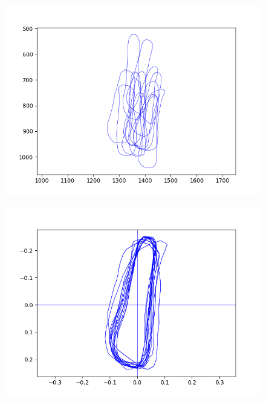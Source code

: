 \documentclass[11pt]{article}
\begin{document}
\begin{figure}[H]
\centering
\begin{minipage}{.5\textwidth}
  \centering
  \includegraphics[width=\linewidth]{unaligned_shapes}
  \label{fig:unaligned}
\end{minipage}%
\begin{minipage}{.5\textwidth}
  \centering
  \includegraphics[width=\linewidth]{aligned_shapes}
  \label{fig:aligned}
\end{minipage}
\end{figure}
\end{document}
